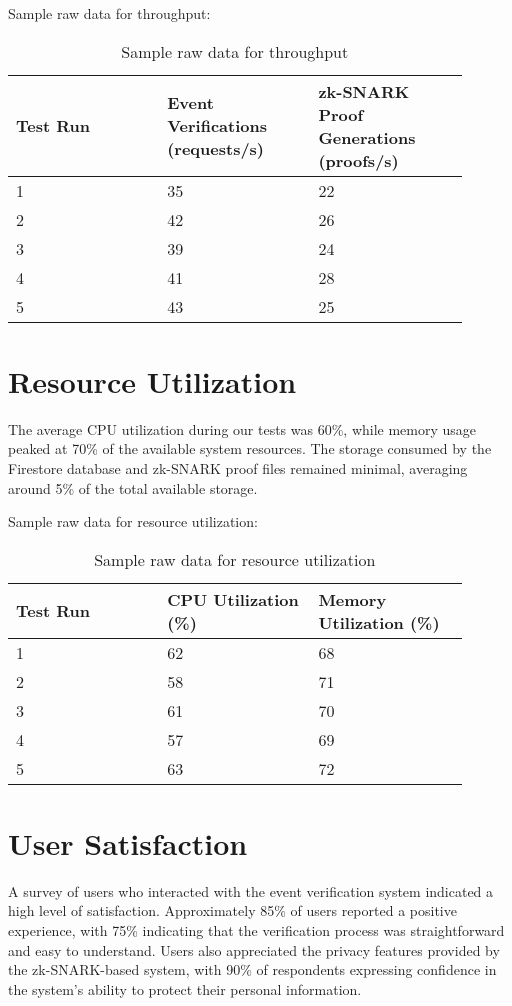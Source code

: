 Sample raw data for throughput:

\begin{table}[h!]
\centering
\begin{tabular}{| p{0.3\linewidth} | p{0.3\linewidth} | p{0.3\linewidth} |}
\hline
\textbf{Test Run} & \textbf{Event Verifications (requests/s)} & \textbf{zk-SNARK Proof Generations (proofs/s)} \\ \hline
1 & 35 & 22 \\
2 & 42 & 26 \\
3 & 39 & 24 \\
4 & 41 & 28 \\
5 & 43 & 25 \\ \hline
\end{tabular}
\caption{Sample raw data for throughput}
\label{tab:raw_throughput}
\end{table}

\section{Resource Utilization}
The average CPU utilization during our tests was 60\%, while memory usage peaked at 70\% of the available system resources. The storage consumed by the Firestore database and zk-SNARK proof files remained minimal, averaging around 5\% of the total available storage.

Sample raw data for resource utilization:

\begin{table}[h!]
\centering
\begin{tabular}{| p{0.3\linewidth} | p{0.3\linewidth} | p{0.3\linewidth} |}
\hline
\textbf{Test Run} & \textbf{CPU Utilization (\%)} & \textbf{Memory Utilization (\%)} \\ \hline
1 & 62 & 68 \\
2 & 58 & 71 \\
3 & 61 & 70 \\
4 & 57 & 69 \\
5 & 63 & 72 \\ \hline
\end{tabular}
\caption{Sample raw data for resource utilization}
\label{tab:raw_resource_utilization}
\end{table}


\section{User Satisfaction}
A survey of users who interacted with the event verification system indicated a high level of satisfaction. Approximately 85\% of users reported a positive experience, with 75\% indicating that the verification process was straightforward and easy to understand. Users also appreciated the privacy features provided by the zk-SNARK-based system, with 90\% of respondents expressing confidence in the system's ability to protect their personal information.

